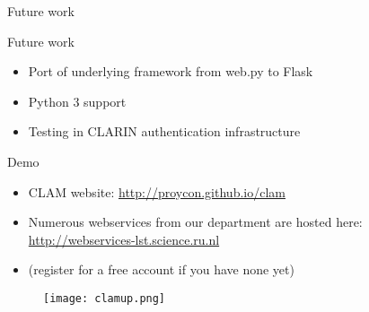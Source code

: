 \documentclass[xcolor=table,10pt,t]{beamer}
\begin{document}
\begin{frame}{Future work}
  \begin{block}{Future work}
      \begin{itemize}
        \item Port of underlying framework from web.py to Flask
        \item Python 3 support
        \item Testing in CLARIN authentication infrastructure
      \end{itemize}
  \end{block}
\end{frame}


\begin{frame}{Demo}
  \begin{block}{}
      \begin{itemize}
        \item CLAM website: \url{http://proycon.github.io/clam}
      \end{itemize}

      \begin{itemize}
        \item Numerous webservices from our department are hosted here:
          \url{http://webservices-lst.science.ru.nl}
        \item (register for a free account if you have none yet)
      \end{itemize}
      \medskip
        \begin{figure}
          \texttt{[image: clamup.png]}
        \end{figure}
  \end{block}
\end{frame}
\end{document}
